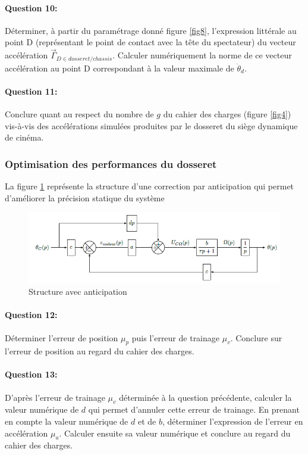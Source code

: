 \paragraph{Question 10:} Déterminer, à partir du paramétrage donné figure \ref{fig8}, l'expression littérale au point D (représentant le point de contact avec la tête du spectateur) du vecteur accélération $\overrightarrow{\Gamma}_{D\in dosseret/chassis}$. Calculer numériquement la norme de ce vecteur accélération au point D correspondant à la valeur maximale de $\ddot{\theta}_d$.

\paragraph{Question 11:} Conclure quant au respect du nombre de $g$ du cahier des charges (figure \ref{fig4}) vis-à-vis des accélérations simulées produites par le dosseret du siège dynamique de cinéma.

\subsubsection{Optimisation des performances du dosseret}

La figure \ref{fig16} représente la structure d'une correction par anticipation qui permet d'améliorer la précision statique du système

\begin{figure}[!ht]
\begin{center}
 \includegraphics[width=0.8\linewidth]{img/img17}
\end{center}
\caption{Structure avec anticipation}
\label{fig16}
\end{figure}

\paragraph{Question 12:} Déterminer l'erreur de position $\mu_p$ puis l'erreur de trainage $\mu_v$. Conclure sur l'erreur de position au regard du cahier des charges.

\paragraph{Question 13:} D'après l'erreur de trainage $\mu_v$ déterminée à la question précédente, calculer la valeur numérique de $d$ qui permet d'annuler cette erreur de trainage. En prenant en compte la valeur numérique de $d$ et de $b$, déterminer l'expression de l'erreur en accélération $\mu_a$. Calculer ensuite sa valeur numérique et conclure au regard du cahier des charges.

